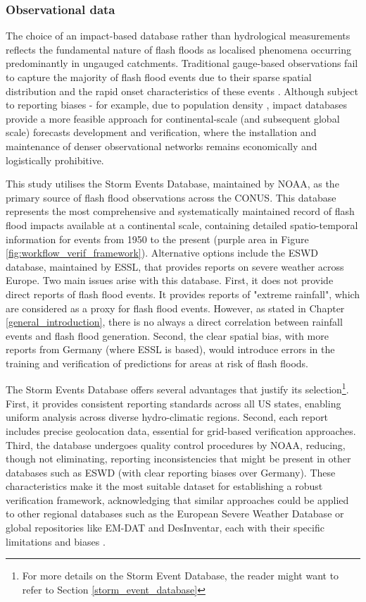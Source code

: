 \subsubsection{Observational data}

The choice of an impact-based database rather than hydrological measurements reflects the fundamental nature of flash floods as localised phenomena occurring predominantly in ungauged catchments. Traditional gauge-based observations fail to capture the majority of flash flood events due to their sparse spatial distribution and the rapid onset characteristics of these events \citep{Gaume_2009, Gaume_2016}. Although subject to reporting biases - for example, due to population density \citep{Marjerison_2016}, impact databases provide a more feasible approach for continental-scale (and subsequent global scale) forecasts development and verification, where the installation and maintenance of denser observational networks remains economically and logistically prohibitive.

This study utilises the Storm Events Database, maintained by NOAA, as the primary source of flash flood observations across the CONUS. This database represents the most comprehensive and systematically maintained record of flash flood impacts available at a continental scale, containing detailed spatio-temporal information for events from 1950 to the present (purple area in Figure \ref{fig:workflow_verif_framework}). Alternative options include the ESWD database, maintained by ESSL, that provides reports on severe weather across Europe. Two main issues arise with this database. First, it does not provide direct reports of flash flood events. It provides reports of "extreme rainfall", which are considered as a proxy for flash flood events. However, as stated in Chapter \ref{general_introduction}, there is no always a direct correlation between rainfall events and flash flood generation. Second, the clear spatial bias, with more reports from Germany (where ESSL is based), would introduce errors in the training and verification of predictions for areas at risk of flash floods.

The Storm Events Database offers several advantages that justify its selection\footnote{For more details on the Storm Event Database, the reader might want to refer to Section \ref{storm_event_database}}. First, it provides consistent reporting standards across all US states, enabling uniform analysis across diverse hydro-climatic regions. Second, each report includes precise geolocation data, essential for grid-based verification approaches. Third, the database undergoes quality control procedures by NOAA, reducing, though not eliminating, reporting inconsistencies that might be present in other databases such as ESWD (with clear reporting biases over Germany). These characteristics make it the most suitable dataset for establishing a robust verification framework, acknowledging that similar approaches could be applied to other regional databases such as the European Severe Weather Database or global repositories like EM-DAT and DesInventar, each with their specific limitations and biases \citep{Panwar_2020}.

